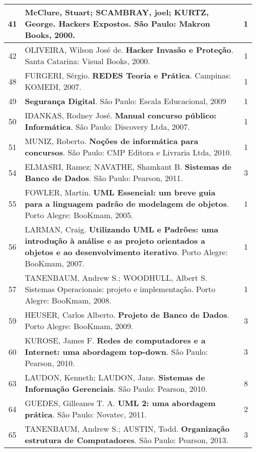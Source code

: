 \begin{longtable}{|c|p{115mm}|c|}
41     & McClure, Stuart; SCAMBRAY, joel; KURTZ, George. \textbf{Hackers Expostos}. São Paulo: Makron Books, 2000. & 1          \\ \hline
42     & OLIVEIRA, Wilson José de. \textbf{Hacker Invasão e Proteção}. Santa Catarina: Visual Books, 2000. & 1          \\ \hline
48     & FURGERI, Sérgio. \textbf{REDES Teoria e Prática}. Campinas: KOMEDI, 2007.             & 1          \\ \hline
49     & \textbf{Segurança Digital}. São Paulo: Escala Educacional, 2009                       & 1          \\ \hline
50     & IDANKAS, Rodney José. \textbf{Manual concurso público: Informática}. São Paulo: Discovery Ltda, 2007. & 1          \\ \hline
51     & MUNIZ, Roberto. \textbf{Noções de informática para concursos}. São Paulo: CMP Editora e Livraria Ltda, 2010. & 1          \\ \hline
54     & ELMASRI, Ramez; NAVATHE, Shamkant B. \textbf{Sistemas de Banco de Dados}. São Paulo: Pearson, 2011. & 3          \\ \hline
55     & FOWLER, Martin. \textbf{UML Essencial: um breve guia para a linguagem padrão de modelagem de objetos}. Porto Alegre: BooKmam, 2005. & 1          \\ \hline
56     & LARMAN, Craig. \textbf{Utilizando UML e Padrões: uma introdução à análise e as projeto orientados a objetos e ao desenvolvimento iterativo}. Porto Alegre: BooKmam, 2007. & 1          \\ \hline
57     & TANENBAUM, Andrew S.; WOODHULL, Albert S. Sistemas Operacionais: projeto e implementação. Porto Alegre: BooKmam, 2008. & 1          \\ \hline
59     & HEUSER, Carlos Alberto. \textbf{Projeto de Banco de Dados}. Porto Alegre: BooKmam, 2009. & 3          \\ \hline
60     & KUROSE, James F. \textbf{Redes de computadores e a Internet: uma abordagem top-down}. São Paulo: Pearson, 2010. & 3          \\ \hline
63     & LAUDON, Kenneth; LAUDON, Jane. \textbf{Sistemas de Informação Gerenciais}. São Paulo: Pearson, 2010. & 8 \\ \hline
64     & GUEDES, Gilleanes T. A. \textbf{UML 2: uma abordagem prática}. São Paulo: Novatec, 2011. & 2          \\ \hline
65     & TANENBAUM, Andrew S.; AUSTIN, Todd. \textbf{Organização estrutura de Computadores}. São Paulo: Pearson, 2013. & 3          \\ \hline

\end{longtable}
